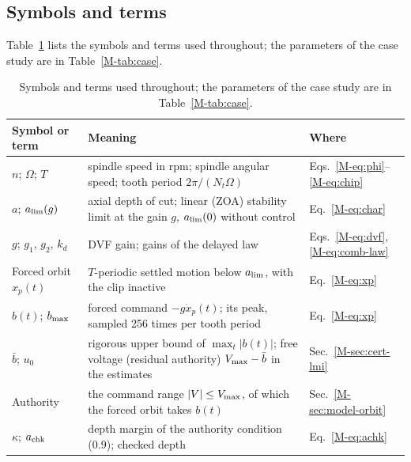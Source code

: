 
\subsection{Symbols and terms}\label{supp:std-model-symbols}

Table~\ref{tab:nomenclature} lists the symbols and terms used throughout; the parameters of the case study are in Table~\ref{M-tab:case}.

\begin{table}[!htbp]
  \centering
  \caption{Symbols and terms used throughout; the parameters of the case study are in Table~\ref{M-tab:case}.}
  \label{tab:nomenclature}
  \footnotesize
  \begin{tabular}{@{}>{\raggedright\arraybackslash}p{}>{\raggedright\arraybackslash}p{}>{\raggedright\arraybackslash}p{}@{}}
    \toprule
    Symbol or term & Meaning & Where\\
    \midrule
    $n$; $\Omega$; $T$ & spindle speed in rpm; spindle angular speed; tooth period $2\pi/(N_t\Omega)$ & Eqs.~\eqref{M-eq:phi}--\eqref{M-eq:chip}\\
    $a$; $a_{\lim}(g)$ & axial depth of cut; linear (ZOA) stability limit at the gain $g$, $a_{\lim}(0)$ without control & Eq.~\eqref{M-eq:char}\\
    $g$; $g_1$, $g_2$, $k_d$ & DVF gain; gains of the delayed law & Eqs.~\eqref{M-eq:dvf}, \eqref{M-eq:comb-law}\\
    Forced orbit $x_p(t)$ & $T$-periodic settled motion below $a_{\lim}$, with the clip inactive & Eq.~\eqref{M-eq:xp}\\
    $b(t)$; $b_{\max}$ & forced command $-g\dot x_p(t)$; its peak, sampled 256 times per tooth period & Eq.~\eqref{M-eq:xp}\\
    $\bar b$; $u_0$ & rigorous upper bound of $\max_t\lvert b(t)\rvert$; free voltage (residual authority) $V_{\max}-\bar b$ in the estimates & Sec.~\ref{M-sec:cert-lmi}\\
    Authority & the command range $\lvert V\rvert\le V_{\max}$, of which the forced orbit takes $b(t)$ & Sec.~\ref{M-sec:model-orbit}\\
    $\kappa$; $a_{\mathrm{chk}}$ & depth margin of the authority condition (0.9); checked depth & Eq.~\eqref{M-eq:achk}\\

\end{tabular}
\end{table}
